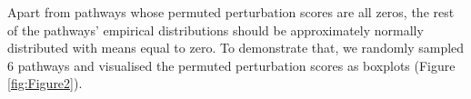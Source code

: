 \documentclass[9pt,a4paper,]{extarticle}
\newenvironment{Shaded}{\begin{snugshade}}{\end{snugshade}}
\newcommand{\AttributeTok}[1]{\textcolor[rgb]{0.77,0.63,0.00}{#1}}
\newcommand{\DecValTok}[1]{\textcolor[rgb]{0.00,0.00,0.81}{#1}}
\newcommand{\FunctionTok}[1]{\textcolor[rgb]{0.00,0.00,0.00}{#1}}
\newcommand{\NormalTok}[1]{#1}
\newcommand{\OtherTok}[1]{\textcolor[rgb]{0.56,0.35,0.01}{#1}}
\newcommand{\SpecialCharTok}[1]{\textcolor[rgb]{0.00,0.00,0.00}{#1}}
\begin{document}
\begin{Shaded}
\end{Shaded}

Apart from pathways whose permuted perturbation scores are all zeros, the rest of the pathways' empirical distributions should be approximately normally distributed with means equal to zero.
To demonstrate that, we randomly sampled 6 pathways and visualised the permuted perturbation scores as boxplots (Figure \ref{fig:Figure2}).
\end{document}
